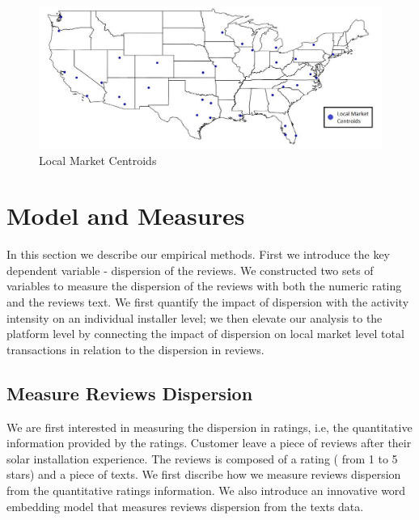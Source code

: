 \documentclass[msom,blindrev]{informs3}
\begin{document}
\begin{figure}
	\centering
	\includegraphics[width=1.1\linewidth]{markets.jpg}
	\caption{Local Market Centroids}
	\label{fig:markets}
\end{figure}


\section{Model and Measures}
In this section we describe our empirical methods. First we introduce the key dependent variable - dispersion of the reviews. We constructed two sets of variables to measure the dispersion of the reviews with both the numeric rating and the reviews text. We first quantify the impact of dispersion with the activity intensity on an individual installer level; we then elevate our analysis to the platform level by connecting the impact of dispersion on local market level total transactions in relation to the dispersion in reviews. 

\subsection{Measure Reviews Dispersion}
\label{subsection_measure_dispersion}
We are first interested in measuring the dispersion in ratings, i.e, the quantitative information provided by the ratings. Customer leave a piece of reviews after their solar installation experience. The reviews is composed of a rating ( from 1 to 5 stars) and a piece of texts. We first discribe how we measure reviews dispersion from the quantitative ratings information. We also introduce an innovative word embedding model that measures reviews dispersion from the texts data. 
\end{document}
